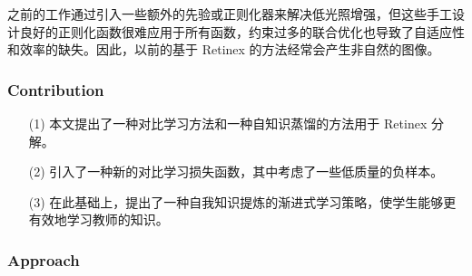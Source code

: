 \documentclass[letterpaper,10pt]{article}
\begin{document}
			之前的工作通过引入一些额外的先验或正则化器来解决低光照增强，但这些手工设计良好的正则化函数很难应用于所有函数，约束过多的联合优化也导致了自适应性和效率的缺失。因此，以前的基于 Retinex 的方法经常会产生非自然的图像。
			
			\subsubsection{Contribution}
			
			\begin{itemize}
				\item [(1)]
				本文提出了一种对比学习方法和一种自知识蒸馏的方法用于 Retinex 分解。
				\item [(2)]
				引入了一种新的对比学习损失函数，其中考虑了一些低质量的负样本。
				\item [(3)]
				在此基础上，提出了一种自我知识提炼的渐进式学习策略，使学生能够更有效地学习教师的知识。
			\end{itemize}

			\subsubsection{Approach}
			
\end{document}

